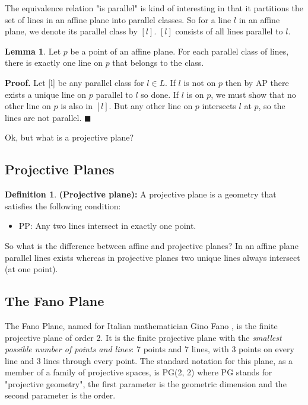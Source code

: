 \documentclass{article}
\theoremstyle{definition}
\newtheorem{definition}{Definition}[section]
\newtheorem{lemma}{Lemma}[section]
\begin{document}
\bigskip
\noindent
The equivalence relation "is parallel" is kind of interesting in that it partitions the set of lines in an affine plane into parallel classes. So for a line $l$ in an affine plane, 
we denote its parallel class by $[l]$. $[l]$ consists of all lines parallel to $l$.

\begin{lemma} Let $p$ be a point of an affine plane. For each parallel class of lines, there is exactly one line on $p$ that belongs to the class.
\end{lemma}

\noindent
\textbf{Proof.} Let [l] be any parallel class for $l \in L$. If $l$ is not on $p$ then by AP there exists a unique line on $p$ parallel to $l$ so done. 
If $l$ is on $p$, we must show that no other line on $p$ is also in $[l]$. But any other line on $p$ intersects $l$ at $p$, so the lines are not parallel.
$\blacksquare$

\bigskip
\noindent
Ok, but what is a projective plane?


\subsection{Projective Planes}
\begin{definition} \textbf{(Projective plane): } A projective plane is a geometry that satisfies the following condition:
\begin{itemize}
\item PP: Any two lines intersect in exactly one point.
\end{itemize}
\end{definition}

\noindent
So what is the difference between affine and projective planes?  In an affine plane parallel
lines exists whereas in projective planes two unique lines always intersect (at one point).

\subsection{The Fano Plane}
\label{subsec:fano_plane}
The Fano Plane, named for Italian mathematician Gino Fano  \cite{wiki:gino_fano}, is the finite projective plane of order 2. It is the finite projective plane with the \emph{smallest 
possible number of points and lines}: 7 points and 7 lines, with 3 points on every line and 3 lines through every point. The standard notation for this plane, 
as a member of a family of projective spaces, is PG(2, 2) where PG stands for "projective geometry", the first parameter is the geometric dimension and 
the second parameter is the order.
\end{document}
